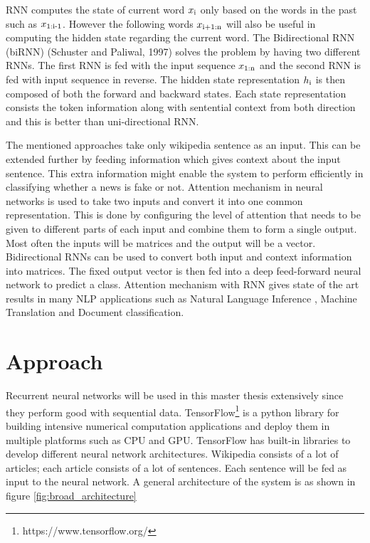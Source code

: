\documentclass[a4paper, 11pt]{article}
\begin{document}
RNN computes the state of current word $x\textsubscript{i}$ only based on the words in the past such as $x\textsubscript{1:i-1}$. However the following words $x\textsubscript{i+1:n}$ will also be useful in computing the hidden state regarding the current word. The Bidirectional RNN (biRNN) (Schuster and Paliwal, 1997) solves the problem by having two different RNNs. The first RNN is fed with the input sequence $x\textsubscript{1:n}$ and the second RNN is fed with input sequence in reverse. The hidden state representation $h\textsubscript{i}$ is then composed of both the forward and backward states. Each state representation consists the token information along with sentential context from both direction and this is better than uni-directional RNN.

The mentioned approaches take only wikipedia sentence as an input. This can be extended further by feeding information which gives context about the input sentence. This extra information might enable the system to perform efficiently in classifying whether a news is fake or not. Attention mechanism in neural networks is used to take two inputs and convert it into one common representation. This is done by configuring the level of attention that needs to be given to different parts of each input and combine them to form a single output. Most often the inputs will be matrices and the output will be a vector. Bidirectional RNNs can be used to convert both input and context information into matrices. The fixed output vector is then fed into a deep feed-forward neural network to predict a class. Attention mechanism with RNN gives state of the art results in many NLP applications such as Natural Language Inference \cite{Parikh2016}, Machine Translation\cite{Bahdanau2014} and Document classification\cite{Yang2016}.

\section{Approach}  
Recurrent neural networks will be used in this master thesis extensively since they perform good with sequential data. TensorFlow\footnote{https://www.tensorflow.org/} is a python library for building intensive numerical computation applications and deploy them in multiple platforms such as CPU and GPU. TensorFlow has built-in libraries to develop different neural network architectures. Wikipedia consists of a lot of articles; each article consists of a lot of sentences. Each sentence will be fed as input to the neural network. A general architecture of the system is as shown in figure \ref{fig:broad_architecture}
\end{document}
